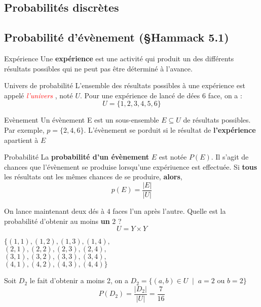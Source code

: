 \documentclass[8pt]{report}
\begin{document}
\begin{multicols*}{2}
\chapter{Probabilités discrètes} 

            

        \section{Probabilité d'évènement (\S Hammack 5.1)}
        \begin{Definitionx}{Expérience}{}
            Une \textbf{expérience} est une activité qui produit un des différents résultats possibles qui 
            ne peut pas être déterminé à l'avance. 
        \end{Definitionx}
        \begin{Definitionx*}{Univers de probabilité}{}
            L'ensemble des résultats possibles à une expérience est appelé \textcolor{red}{\textit{l'univers}}
            , noté $U$. Pour une expérience de lancé de dées 6 face, on a :
                                \[ U = \{1, 2, 3, 4, 5, 6 \} \] 
        \end{Definitionx*}
        \begin{Definitionx}{Evènement}{}
                Un évènement E est un sous-ensemble $E \subseteq U$ de résultats possibles. Par exemple, 
                $p = \{ 2, 4, 6 \}$. L'évènement se porduit si le résultat de \textbf{l'expérience} 
                apartient à $E$
        \end{Definitionx}

        \begin{Definitionx}{Probabilité}{}
            La \textbf{probabilité d'un évènement} $E$ est notée $P(E)$. Il s'agit de chances que l'évènement 
            se produise lorsqu'une expériuence est effectuée. 
            Si \textbf{tous} les résultats ont les 
            mêmes chances de se produire, \textbf{alors}, 
            \[ p(E) = \dfrac{|E|}{|U|} \]
        \end{Definitionx}

        \begin{EExample}{}{}
                On lance maintenant deux dés à $4$ faces l'un après l'autre. Quelle est la probabilité d'obtenir au 
                moins \textbf{un}   $2$ ?
                \[ U = Y \times Y  \]
              \begin{center}
              $\Big\{(1, 1), (1, 2), (1, 3), (1, 4),$ \\ 
              $(2, 1), (2, 2), (2, 3), (2, 4),$ \\ 
              $(3, 1), (3, 2), (3, 3), (3, 4),$\\ 
              $(4, 1), (4, 2), (4, 3), (4, 4) \Bigr\}$
              \end{center}
            Soit $D_2$ le fait d'obtenir a moins 2, on  a 
            $D_2 = \{ (a,b) \in U\;\; | \;\; a = 2 \text{ ou } b = 2 \}$  
            \[ P(D_2) = \dfrac{|D_2|}{|U|} = \dfrac{7}{16} \]
        \end{EExample}




\end{multicols*}
\end{document}
